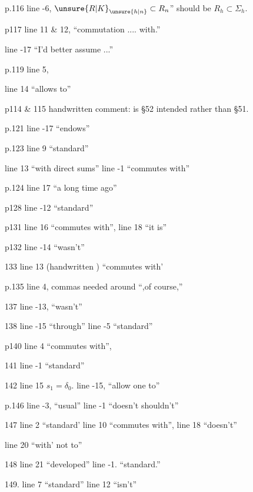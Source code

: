 
p.116 line -6, $\unsure{R|K}_{\unsure{h|n}}\subset R_n$'' should be $R_h\subset\Sigma_h$.

p117 line 11 \& 12, ``commutation .... with.''

line -17 ``I'd better assume ...''

p.119 line 5, 

line 14 ``allows  to''

p114 \& 115 handwritten comment: is \S52 intended rather than \S51.

p.121 line -17 ``endows''


p.123 line 9 ``standard''

line 13 ``with direct sums'' line -1 ``commutes with''

p.124 line 17 ``a long time ago''

p128 line -12 ``standard''

p131 line 16 ``commutes with'', line 18 ``it is''

p132 line -14 ``wasn't''

133 line 13 (handwritten ) ``commutes with'

p.135 line 4, commas needed around ``,of course,''

137 line -13, ``wasn't''

138 line -15 ``through'' line -5 ``standard''

p140 line 4 ``commutes with'',

141 line -1 ``standard''

142 line 15 $s_1=\delta_0$. line -15, ``allow one to''

p.146 line -3, ``usual''  line -1 ``doesn't  shouldn't''

147  line 2 ``standard' line 10 ``commutes with'', line 18 ``doesn't''

line 20 ``with' not to''

148 line 21 ``developed'' line -1. ``standard.''

149. line 7 ``standard'' line 12 ``isn't''


